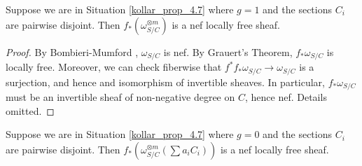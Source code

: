 \begin{lemma}\label{base_case_genus_1}
Suppose we are in Situation \ref{kollar_prop_4.7} where $g=1$ and the sections $C_i$ are pairwise disjoint.
Then $f_{*}(\omega_{S/C}^{\otimes m})$ is a nef locally free sheaf.
\end{lemma}
\begin{proof}
By Bombieri-Mumford , $\omega_{S/C}$ is nef.
By Grauert's Theorem, $f_{*}\omega_{S/C}$ is locally free.
Moreover, we can check fiberwise that $f^{*}f_{*}\omega_{S/C}\to\omega_{S/C}$ is a surjection, and hence and isomorphism of invertible sheaves.
In particular, $f_{*}\omega_{S/C}$ must be an invertible sheaf of non-negative degree on $C$, hence nef.
Details omitted.
\end{proof}

\begin{lemma}\label{inductive_step_genus_0}
Suppose we are in Situation \ref{kollar_prop_4.7} where $g=0$ and the sections $C_i$ are pairwise disjoint.
Then $f_{*}(\omega_{S/C}^{\otimes m}(\sum a_iC_i))$ is a nef locally free sheaf.
\end{lemma}
